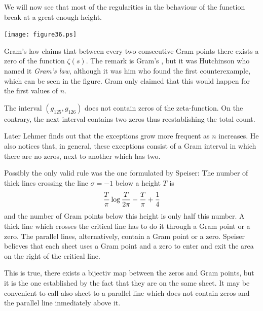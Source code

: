 \documentclass[a4paper]{amsart}
\numberwithin{equation}{section}
\begin{document}
\begin{large}
We will now see that most of the regularities in the behaviour of the function
break at a great enough height.



\bigskip





\begin{minipage}{6cm}
\hspace{-0.8cm}
\vspace{-0.3cm}                                 %
\texttt{[image: figure36.ps]}   %
\ \vspace{-0.cm}  \                             %
\end{minipage}
\hfil
\hspace{-1.4cm}
\begin{minipage}{6.6cm}
    \vspace{-0.3cm}
    Gram's law claims that between every two consecutive Gram points 
    there exists a zero
of the function $\zeta(s)$. The remark is Gram's \cite{G}, but it was Hutchinson who
named it {\sl Gram's law}, although it was him who found the first
counterexample, which can be seen in the figure. Gram \cite{G} only claimed that
this would happen for the first values of $n$.

The interval $(g_{125}, g_{126})$ does not contain zeros of the zeta-function.
On the contrary, the next interval contains two zeros thus reestablishing the
total count.

Later Lehmer \cite{Le} finds out that the exceptions grow more frequent as $n$
increases. He also notices that, in general, these exceptions consist of a Gram
interval in which there are no zeros, next to another which has two.
\medskip

Possibly the only valid rule was the one formulated by Speiser: The number of
thick lines crossing the line $\sigma= -1$ below a height $T$ is
$${T\over\pi}\log{T\over2\pi}-{T\over\pi}+{1\over4}$$
and the number of Gram points below this height is only half this number. A
thick line which crosses the critical line has to do it through a Gram point or
a zero. The parallel lines, alternatively, contain a Gram point or a zero.
Speiser believes that each sheet uses a Gram point and a zero to enter and exit
the area on the right of the critical line. 
\end{minipage}
\vfil\eject

\noindent
This is true, there exists a
bijectiv map between the zeros and Gram points, but it is the one established
by the fact that they are on the same sheet. It may be convenient to call also
sheet to a parallel line which does not contain zeros and the parallel line
inmediately above it.


\end{large}
\end{document}
